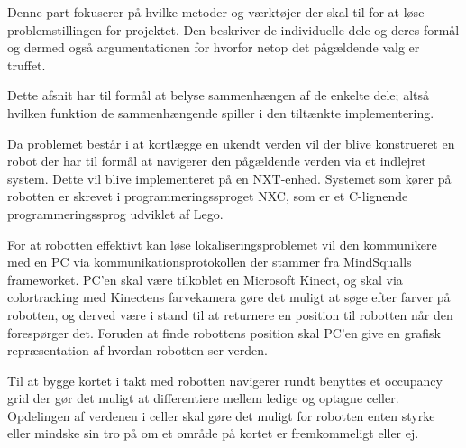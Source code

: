 Denne part fokuserer på hvilke metoder og værktøjer der skal til for at løse problemstillingen for projektet.
Den beskriver de individuelle dele og deres formål og dermed også argumentationen for hvorfor netop det pågældende valg er truffet.

Dette afsnit har til formål at belyse sammenhængen af de enkelte dele; altså hvilken funktion de sammenhængende spiller i den tiltænkte implementering.

Da problemet består i at kortlægge en ukendt verden vil der blive konstrueret en robot der har til formål at navigerer den pågældende verden via et indlejret system.
Dette vil blive implementeret på en NXT-enhed.
Systemet som kører på robotten er skrevet i programmeringssproget NXC, som er et C-lignende programmeringssprog udviklet af Lego.

For at robotten effektivt kan løse lokaliseringsproblemet vil den kommunikere med en PC via kommunikationsprotokollen der stammer fra MindSqualls frameworket.
PC'en skal være tilkoblet en Microsoft Kinect, og skal via colortracking med Kinectens farvekamera gøre det muligt at søge efter farver på robotten, og derved være i stand til at returnere en position til robotten når den forespørger det.
Foruden at finde robottens position skal PC'en give en grafisk repræsentation af hvordan robotten ser verden.

Til at bygge kortet i takt med robotten navigerer rundt benyttes et occupancy grid der gør det muligt at differentiere mellem ledige og optagne celler.
Opdelingen af verdenen i celler skal gøre det muligt for robotten enten styrke eller mindske sin tro på om et område på kortet er fremkommeligt eller ej.